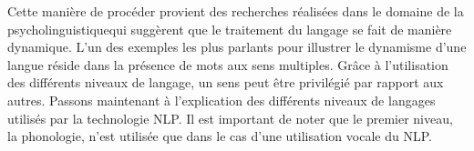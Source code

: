 \documentclass{rapport}
\begin{document}
Cette manière de procéder provient des recherches réalisées dans le domaine de la psycholinguistique\footnotemark[1] qui suggèrent que le traitement du langage se fait de manière dynamique. L'un des exemples les plus parlants pour illustrer le dynamisme d'une langue réside dans la présence de mots aux sens multiples. Grâce à l'utilisation des différents niveaux de langage, un sens peut être privilégié par rapport aux autres. Passons maintenant à l'explication des différents niveaux de langages utilisés par la technologie NLP. Il est important de noter que le premier niveau, la phonologie, n'est utilisée que dans le cas d'une utilisation vocale du NLP. 
\end{document}
